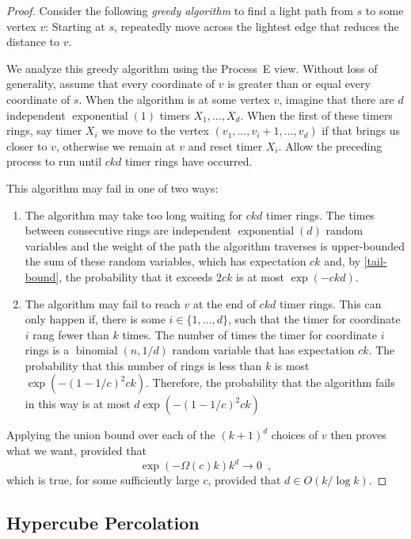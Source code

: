 \documentclass[lotsofwhite]{patmorin}
\DeclareMathOperator{\exponential}{exponential}
\DeclareMathOperator{\binomial}{binomial}
\begin{document}
\begin{proof}
   Consider the following \emph{greedy algorithm} to find a light path
   from $s$ to some vertex $v$:  Starting at $s$, repeatedly
   move across the lightest edge that reduces the distance to $v$.

   We analyze this greedy algorithm using the Process~E view. Without
   loss of generality, assume that every coordinate of $v$ is greater
   than or equal every coordinate of $s$.  When the algorithm is at some
   vertex $v$, imagine that there are $d$ independent $\exponential(1)$
   timers $X_1,\ldots,X_d$. When the first of these timers rings, say
   timer $X_i$ we move to the vertex $(v_1,\ldots,v_{i}+1,\ldots,v_d)$
   if that brings us closer to $v$, otherwise we remain at $v$ and reset
   timer $X_i$.  
   Allow the preceding process to run until $ckd$ timer rings have
   occurred.  

   This algorithm may fail in one of two ways:
   \begin{enumerate}
      \item The algorithm may take too long waiting for $ckd$ timer
       rings.  The times between consecutive rings are independent
       $\exponential(d)$ random variables and the weight of the path
       the algorithm traverses is upper-bounded the sum of these random
       variables, which has expectation $ck$ and, by \eqref{tail-bound},
       the probability that it exceeds $2ck$ is at most $\exp(-ckd)$.

      \item The algorithm may fail to reach $v$ at the end of $ckd$ timer
      rings.  This can only happen if, there is some $i\in\{1,\ldots,d\}$,
      such that the timer for coordinate $i$ rang fewer than $k$ times.
      The number of times the timer for coordinate $i$ rings is a
      $\binomial(n,1/d)$ random variable that has expectation $ck$.
      The probability that this number of rings is less than $k$ is
      most $\exp(-(1-1/c)^2ck)$.  Therefore, the probability that the 
      algorithm fails in this way is at most $d\exp(-(1-1/c)^2ck)$
   \end{enumerate} 

   Applying the union bound over each of the $(k+1)^{d}$ choices of $v$
   then proves what we want, provided that
   \[
         \exp(-\Omega(c)k) k^d \to 0 \enspace ,
   \]
   which is true, for some sufficiently large $c$, provided that $d\in O(k/\log k)$.
\end{proof}

\subsection{Hypercube Percolation}
\end{document}
